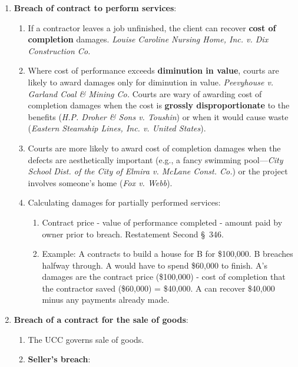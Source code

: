 \begin{enumerate}
    \item \textbf{Breach of contract to perform services}:
    \begin{enumerate}
        \item If a contractor leaves a job unfinished, the client can recover 
        \textbf{cost of completion} damages. \emph{Louise Caroline Nursing 
        Home, Inc. v. Dix Construction Co.}
        \item Where cost of performance exceeds \textbf{diminution in value}, 
        courts are likely to award damages only for diminution in value.  
        \emph{Peevyhouse v. Garland Coal \& Mining Co.} Courts are wary of 
        awarding cost of completion damages when the cost is \textbf{grossly 
        disproportionate} to the benefits (\emph{H.P. Droher \& Sons v. 
        Toushin}) or when it would cause waste (\emph{Eastern Steamship Lines, 
        Inc. v.  United States}).
        \item Courts are more likely to award cost of completion damages when 
        the defects are aesthetically important (e.g., a fancy swimming 
        pool---\emph{City School Dist. of the City of Elmira v.  McLane Const.  
        Co.}) or the project involves someone's home (\emph{Fox v. Webb}).  
        \item Calculating damages for partially performed services:
        \begin{enumerate}
            \item Contract price - value of performance completed - amount 
            paid by owner prior to breach. Restatement Second \S\ 346.
            \item Example: A contracts to build a house for B for \$100,000. B 
            breaches halfway through. A would have to spend \$60,000 to 
            finish.  A's damages are the contract price (\$100,000) - cost of 
            completion that the contractor saved (\$60,000) = \$40,000. A can 
            recover \$40,000 minus any payments already made.
        \end{enumerate}
    \end{enumerate}
    \item \textbf{Breach of a contract for the sale of goods}:
    \begin{enumerate}
        \item The UCC governs sale of goods.
        \item \textbf{Seller's breach}:
        \begin{enumerate}

\end{enumerate}
\end{enumerate}
\end{enumerate}
